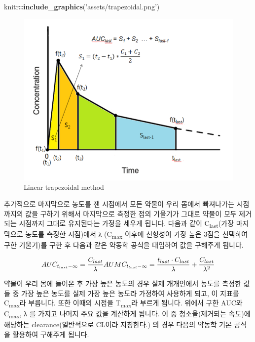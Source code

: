 \documentclass[12pt,]{krantz}
\newenvironment{Shaded}{\begin{snugshade}}{\end{snugshade}}
\newcommand{\KeywordTok}[1]{\textcolor[rgb]{0.13,0.29,0.53}{\textbf{#1}}}
\newcommand{\NormalTok}[1]{#1}
\newcommand{\OperatorTok}[1]{\textcolor[rgb]{0.81,0.36,0.00}{\textbf{#1}}}
\newcommand{\StringTok}[1]{\textcolor[rgb]{0.31,0.60,0.02}{#1}}
\begin{document}
\begin{Shaded}
\begin{Highlighting}[]
\NormalTok{knitr}\OperatorTok{::}\KeywordTok{include_graphics}\NormalTok{(}\StringTok{'assets/trapezoidal.png'}\NormalTok{)}
\end{Highlighting}
\end{Shaded}

\begin{figure}
\includegraphics[width=1\linewidth]{assets/trapezoidal} \caption{Linear trapezoidal method}\label{fig:trapezoid}
\end{figure}

추가적으로 마지막으로 농도를 잰 시점에서 모든 약물이 우리 몸에서 빠져나가는 시점까지의 값을 구하기 위해서 마지막으로 측정한 점의 기울기가 그대로 약물이 모두 제거되는 시점까지 그대로 유지된다는 가정을 세우게 됩니다.
다음과 같이 C\textsubscript{last}(가장 마지막으로 농도를 측정한 시점)에서 λ (C\textsubscript{max} 이후에 선형성이 가장 높은 3점을 선택하여 구한 기울기)를 구한 후 다음과 같은 약동학 공식을 대입하여 값을 구해주게 됩니다.

\[
AUC_{t_{last}-\infty} = 
  \frac{C_{last}}{\lambda} \\
AUMC_{t_{last}-\infty} = 
  \frac{t_{last} \cdot C_{last}}{\lambda} + 
  \frac{C_{last}}{\lambda^2}
\]

약물이 우리 몸에 들어온 후 가장 높은 농도의 경우 실제 개개인에서 농도를 측정한 값들 중 가장 높은 농도를 실제 가장 높은 농도라 가정하여 사용하게 되고, 이 지표를 C\textsubscript{max}라 부릅니다. 또한 이때의 시점을 T\textsubscript{max}라 부르게 됩니다.
위에서 구한 AUC와 C\textsubscript{max}, λ 를 가지고 나머지 주요 값을 계산하게 됩니다.
이 중 청소율(제거되는 속도)에 해당하는 clearance(일반적으로 CL이라 지칭한다.) 의 경우 다음의 약동학 기본 공식을 활용하여 구해주게 됩니다.
\end{document}
